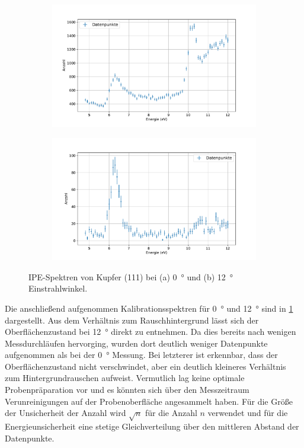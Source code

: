 \begin{figure}[!ht]
    \centering
    \begin{subfigure}{0.495\textwidth}
        \centering
        \includegraphics[width=1.1\textwidth]{plots/Cu_0.pdf}
    \caption{}
    \end{subfigure}
    \begin{subfigure}{0.495\textwidth}
        \centering
        \includegraphics[width=1.1\textwidth]{plots/Cu_12.pdf}
        \caption{}
    \end{subfigure}
    \caption{IPE-Spektren von Kupfer (111) bei (a) \SI{0}{\degree} und (b) \SI{12}{\degree} Einstrahlwinkel.}
    \label{fig_Cu_kal}
\end{figure}
Die anschließend aufgenommen Kalibrationsspektren für \SI{0}{\degree} und \SI{12}{\degree} sind in \cref{fig_Cu_kal} dargestellt.
Aus dem Verhältnis zum Rauschhintergrund lässt sich der Oberflächenzustand bei \SI{12}{\degree} direkt zu entnehmen.
Da dies bereits nach wenigen Messdurchläufen hervorging, wurden dort deutlich weniger Datenpunkte aufgenommen als bei der \SI{0}{\degree} Messung.
Bei letzterer ist erkennbar, dass der Oberflächenzustand nicht verschwindet, aber ein deutlich kleineres Verhältnis zum Hintergrundrauschen aufweist.
Vermutlich lag keine optimale Probenpräparation vor und es könnten sich über den Messzeitraum Verunreinigungen auf der Probenoberfläche angesammelt haben.
Für die Größe der Unsicherheit der Anzahl wird $\sqrt{n}$ für die Anzahl $n$ verwendet und für die Energieunsicherheit eine stetige Gleichverteilung über den mittleren Abstand der Datenpunkte.

